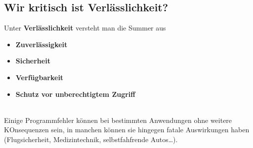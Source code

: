 \subsection{Wir kritisch ist Verlässlichkeit?}
Unter \textbf{Verlässlichkeit} versteht man die Summer aus
\begin{itemize}
    \item \textbf{Zuverlässigkeit}
    \item \textbf{Sicherheit}
    \item \textbf{Verfügbarkeit}
    \item \textbf{Schutz vor unberechtigtem Zugriff}
\end{itemize}\\

\noindent
Einige Programmfehler können bei bestimmten Anwendungen ohne weitere KOnsequenzen sein, in manchen können sie hingegen fatale Auswirkungen haben (Flugsicherheit, Medizintechnik, selbstfahfrende Autos\ldots).

